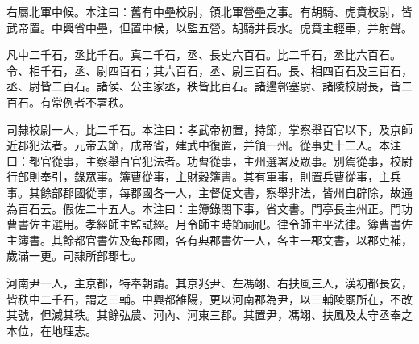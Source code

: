 \begin{pinyinscope}
右屬北軍中候。本注曰：舊有中壘校尉，領北軍營壘之事。有胡騎、虎賁校尉，皆武帝置。中興省中壘，但置中候，以監五營。胡騎并長水。虎賁主輕車，并射聲。

凡中二千石，丞比千石。真二千石，丞、長史六百石。比二千石，丞比六百石。令、相千石，丞、尉四百石；其六百石，丞、尉三百石。長、相四百石及三百石，丞、尉皆二百石。諸侯、公主家丞，秩皆比百石。諸邊鄣塞尉、諸陵校尉長，皆二百石。有常例者不署秩。

司隸校尉一人，比二千石。本注曰：孝武帝初置，持節，掌察舉百官以下，及京師近郡犯法者。元帝去節，成帝省，建武中復置，并領一州。從事史十二人。本注曰：都官從事，主察舉百官犯法者。功曹從事，主州選署及眾事。別駕從事，校尉行部則奉引，錄眾事。簿曹從事，主財穀簿書。其有軍事，則置兵曹從事，主兵事。其餘部郡國從事，每郡國各一人，主督促文書，察舉非法，皆州自辟除，故通為百石云。假佐二十五人。本注曰：主簿錄閤下事，省文書。門亭長主州正。門功曹書佐主選用。孝經師主監試經。月令師主時節祠祀。律令師主平法律。簿曹書佐主簿書。其餘都官書佐及每郡國，各有典郡書佐一人，各主一郡文書，以郡吏補，歲滿一更。司隸所部郡七。

河南尹一人，主京都，特奉朝請。其京兆尹、左馮翊、右扶風三人，漢初都長安，皆秩中二千石，謂之三輔。中興都雒陽，更以河南郡為尹，以三輔陵廟所在，不改其號，但減其秩。其餘弘農、河內、河東三郡。其置尹，馮翊、扶風及太守丞奉之本位，在地理志。


\end{pinyinscope}